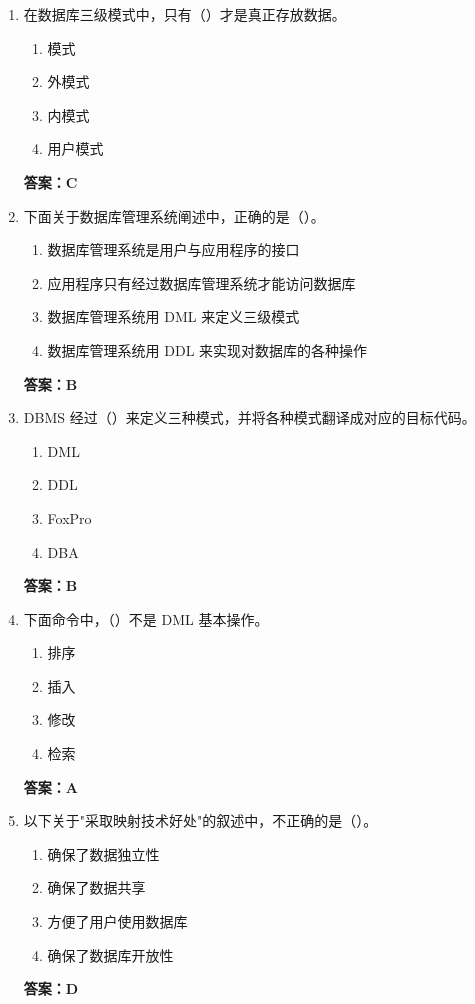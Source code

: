 \documentclass[12pt, a4paper]{article}
\begin{document}
\begin{enumerate}[label=\arabic*.]
	\item 在数据库三级模式中，只有（\quad）才是真正存放数据。
	      \begin{enumerate}
		      \item 模式
		      \item 外模式
		      \item 内模式
		      \item 用户模式
	      \end{enumerate}
	      \textbf{答案：C}

	\item 下面关于数据库管理系统阐述中，正确的是（\quad）。
	      \begin{enumerate}
		      \item 数据库管理系统是用户与应用程序的接口
		      \item 应用程序只有经过数据库管理系统才能访问数据库
		      \item 数据库管理系统用 DML 来定义三级模式
		      \item 数据库管理系统用 DDL 来实现对数据库的各种操作
	      \end{enumerate}
	      \textbf{答案：B}

	\item DBMS 经过（\quad）来定义三种模式，并将各种模式翻译成对应的目标代码。
	      \begin{enumerate}
		      \item DML
		      \item DDL
		      \item FoxPro
		      \item DBA
	      \end{enumerate}
	      \textbf{答案：B}

	\item 下面命令中，（\quad）不是 DML 基本操作。
	      \begin{enumerate}
		      \item 排序
		      \item 插入
		      \item 修改
		      \item 检索
	      \end{enumerate}
	      \textbf{答案：A}

	\item 以下关于"采取映射技术好处"的叙述中，不正确的是（\quad）。
	      \begin{enumerate}
		      \item 确保了数据独立性
		      \item 确保了数据共享
		      \item 方便了用户使用数据库
		      \item 确保了数据库开放性
	      \end{enumerate}
	      \textbf{答案：D}


\end{enumerate}
\end{document}
